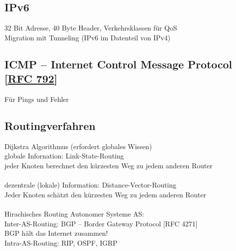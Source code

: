 \documentclass[fs, footer]{latex4ei}
\begin{document}
\begin{multicols*}{4}
	\subsection{IPv6}
	32 Bit Adresse, 40 Byte Header, Verkehrsklassen für QoS\\
	Migration mit Tunneling (IPv6 im Datenteil von IPv4)\\

	\subsection{ICMP -- Internet Control Message Protocol [\href{https://tools.ietf.org/html/rfc792}{RFC 792}]}
	Für Pings und Fehler

	\subsection{Routingverfahren}
	Dijkstra Algorithmus (erfordert globales Wissen)\\
	globale Infornation: Link-State-Routing\\
	jeder Knoten berechnet den kürzesten Weg zu jedem anderen Router\\
	\\
	dezentrale (lokale) Information: Distance-Vector-Routing\\
	Jeder Knoten schätzt den kürzesten Weg zu jedem anderen Router\\
	\\
	Hirachisches Routing Autonomer Systeme AS:\\
	Inter-AS-Routing: BGP -- Border Gateway Protocol [RFC 4271]\\
	BGP hält das Internet zusammen!\\
	Intra-AS-Routing: RIP, OSPF, IGRP\\



\end{multicols*}
\end{document}
